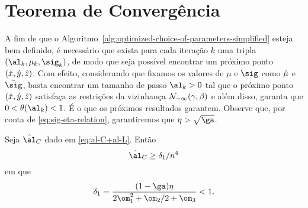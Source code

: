 \section{Teorema de Convergência}

A fim de que o Algoritmo~\ref{alg:optimized-choice-of-parameters-simplified} esteja bem definido, é necessário que exista para cada iteração $k$ uma tripla $(\al_k,\mu_k,\sig_k)$, de modo que seja possível encontrar um próximo ponto $(\hat{x},\hat{y},\hat{z})$. Com efeito, considerando que fixamos os valores de $\mu$ e $\sig$ como $\hat{\mu} $ e  $\nextsig$, basta encontrar um  tamanho de passo ${\al_k}>0$ tal que o próximo ponto $(\hat{x},\hat{y},\hat{z})$ satisfaça as restrições da vizinhança 
$\mathcal{N}_{-\infty}(\gamma,\beta)$ e além disso, garanta que  $0 < \theta(\al_k) <1$. É o que os próximos resultados garantem. Observe que, por conta de \eqref{eq:sig-eta-relation}, garantiremos que $\eta>\sqrt{\ga}$.



\begin{lema}\label{lemma:alC_delta-1}
Seja $\nextal_{C}$ dado em \eqref{eq:al-C+al-L}. Então 
\[
\nextal_{C} \geq \delta_{1}/n^{4}
\]
em que 
\[
\delta_{1} = \dfrac{(1-\ga)\eta}{2\om_{1}^{2} + \om_{2}/2 + \om_{3}  } < 1.
\]
\end{lema}

